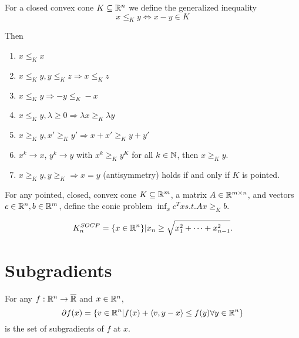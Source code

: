 \begin{thm}
  \label{sec:cones-gener-ineq-5}
  For a closed convex cone $K \subseteq \mathbb{R}^{n}$ we define the
  generalized inequality
  \begin{equation}
    \label{eq:11}
    x \leq_{K} y \iff x - y \in K
  \end{equation}

  Then
  \begin{enumerate}
  \item $x \leq_{K} x$
  \item $x \leq_{K} y, y \leq_{K} z \Rightarrow x \leq_{K} z$
  \item $x \leq_{K} y \Rightarrow -y \leq_{K} -x$
  \item $x \leq_{K} y, \lambda \geq 0 \Rightarrow \lambda x \geq_{K}
    \lambda y$
  \item $x \geq_{K} y, x' \geq_{K} y' \Rightarrow x + x' \geq_{K} y + y'$
  \item $x^{k} \rightarrow x$, $y^{k} \rightarrow y$ with $x^{k}
    \geq_{K} y^{K}$ for all $k \in \mathbb{N}$, then $x \geq_{K} y$.
  \item $x \geq_{K} y, y \geq_{K} \Rightarrow x = y$ (antisymmetry)
    holds if and only if $K$ is pointed.
  \end{enumerate}
\end{thm}

\begin{defn}[$K_{n}^{LP}$]
  \label{sec:cones-gener-ineq-6}
  For any pointed, closed, convex cone $K \subseteq \mathbb{R}^{m}$, a matrix
  $A \in \mathbb{R}^{m \times n}$, and vectors $c \in \mathbb{R}^{n}, b \in \mathbb{R}^{m}$,
  define the conic problem $\inf_{x} c^{T} x s.t. Ax \geq_{K} b$.
\end{defn}

\begin{defn}[$K_{n}^{SOCP}$]
  \begin{equation}
    \label{eq:55}
    K_{n}^{SOCP} = \{ x \in \mathbb{R}^{n} \}  | x_{n} \geq \sqrt{x_{1}^{2} +
      \dots + x_{n-1}^{2}}.
  \end{equation}
\end{defn}

\section{Subgradients}
\label{sec:subgradients}

\begin{defn}
  \label{sec:subgradients-1}
  For any $f: \mathbb{R}^{n} \rightarrow \overline {\mathbb{R}}$ and $x \in \mathbb{R}^{n}$,
  \begin{equation}
    \label{eq:12}
    \partial f(x) = \{ v \in \R^{n} | f(x) + \IP{v, y -x} \leq f(y)
    \forall y \in \R^{n} \}
  \end{equation} is the set of subgradients of $f$ at $x$.
\end{defn}


